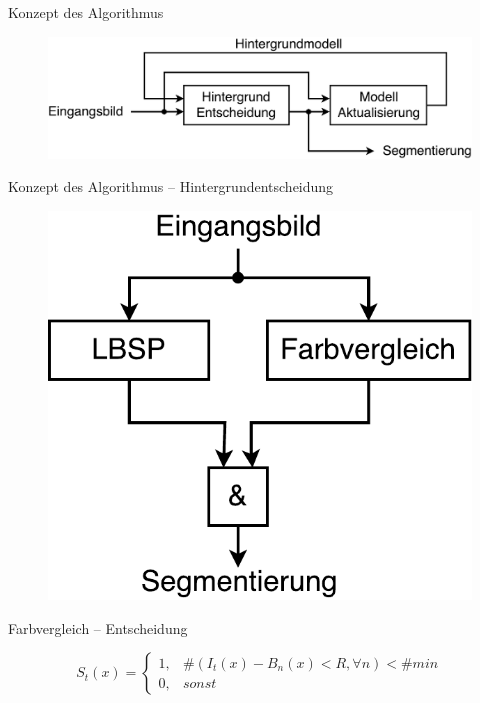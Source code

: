 \documentclass[hyperref={pdfpagelabels=false}]{beamer}
\begin{document}
\begin{frame}[t]{Konzept des Algorithmus}
	\bigskip
	\bigskip
	\bigskip 
	\begin{figure}
		\centering
		\includegraphics[width=1\linewidth]{Abbildungen/gesamt.pdf}
		\label{fig:Abbildungen/Grid}
	\end{figure}
\end{frame}


\begin{frame}[t]{Konzept des Algorithmus -- Hintergrundentscheidung}
	\begin{figure}
		\centering
		\includegraphics[width=0.6\linewidth]{Abbildungen/Konzept.pdf}
		\label{fig:Abbildungen/Grid}
	\end{figure}
\end{frame}



\begin{frame}[t]{Farbvergleich -- Entscheidung }
	\bigskip
	\bigskip
	\bigskip


	\begin{equation*}
		S_t(x)= \left\{
				\begin{array}{ll} 
					1, &  \# (I_t(x) - B_n(x) < R, \forall n) < \# min\\
					0, & sonst
				\end{array}
			\right .
	\end{equation*}
\end{frame}
\end{document}
